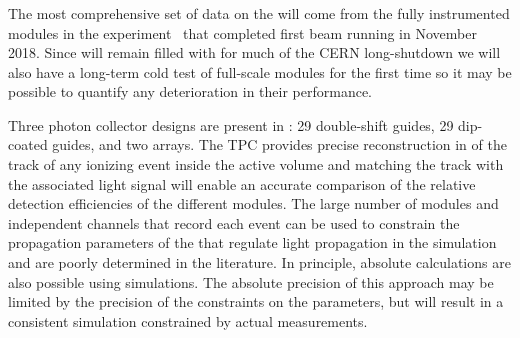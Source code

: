 


\subsubsection{}
\label{sec:valid-pdsp}

The most comprehensive set of data on the  will come from the fully instrumented modules in the  experiment~\cite{Abi:2017aow} that completed first beam running in November \num{2018}. 
Since  will remain filled with \lar for much of the CERN long-shutdown we will also have a long-term cold test of full-scale  modules for the first time so it may be possible to quantify any deterioration in their performance.

Three photon collector designs are present in : \num{29} double-shift guides, \num{29} dip-coated guides, and two  arrays. 
The TPC provides precise reconstruction in \threed of the track of any ionizing event inside the active volume and matching the track with the associated light signal will enable an accurate comparison of the relative detection efficiencies of the different  modules. 
The large number of modules and independent channels that record each event can be used to constrain the propagation parameters of the \lar that regulate  light propagation in the simulation and are poorly determined in the literature. %
In principle, absolute calculations are also possible using  simulations.
The absolute precision of this approach may be limited by the precision of the constraints on the parameters, but will result in a consistent simulation constrained by actual measurements. 

